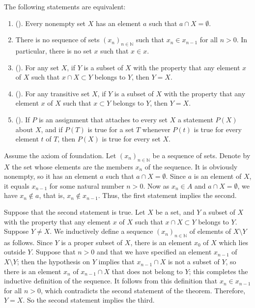 \documentclass{article}
\begin{document}
\begin{theorem}
  \label{thm:3e5kymup}
  The following statements are equivalent:
  \begin{enumerate}
  \item ().  Every nonempty set \(X\)
    has an element \(a\) such that \(a \cap X = \emptyset\).
  \item There is no sequence of sets \((x_n)_{n \in \mathbb{N}}\) such
    that \(x_n \in x_{n - 1}\) for all \(n > 0\).  In particular,
    there is no set \(x\) such that \(x \in x\).
  \item (). For any set
    \(X\), if \(Y\) is a subset of \(X\) with the property that any
    element \(x\) of \(X\) such that \(x \cap X \subset Y\) belongs to
    \(Y\), then \(Y = X\).
  \item (). For any
    transitive set \(X\), if \(Y\) is a subset of \(X\) with the
    property that any element \(x\) of \(X\) such that \(x \subset Y\)
    belongs to \(Y\), then \(Y = X\).
  \item \label{item:d0wtwe3c} (). If \(P\) is an assignment that attaches to
    every set \(X\) a statement \(P(X)\) about \(X\), and if \(P(T)\)
    is true for a set \(T\) whenever \(P(t)\) is true for every
    element \(t\) of \(T\), then \(P(X)\) is true for every set \(X\).
  \end{enumerate}
\end{theorem}

Assume the axiom of foundation.  Let \((x_n)_{n \in \mathbb{N}}\) be a
sequence of sets.  Denote by \(X\) the set whose elements are the
members \(x_n\) of the sequence.  It is obviously nonempty, so it has
an element \(a\) such that \(a \cap X = \emptyset\).  Since \(a\) is
an element of \(X\), it equals \(x_{n - 1}\) for some natural number
\(n > 0\).  Now as \(x_n \in A\) and \(a \cap X = \emptyset\), we have
\(x_n \notin a\), that is, \(x_n \notin x_{n - 1}\).  Thus, the first
statement implies the second.

Suppose that the second statement is true.  Let \(X\) be a set, and
\(Y\) a subset of \(X\) with the property that any element \(x\) of
\(X\) such that \(x \cap X \subset Y\) belongs to \(Y\).  Suppose
\(Y \neq X\).  We inductively define a sequence
\((x_n)_{n \in \mathbb{N}}\) of elements of \(X \setminus Y\) as
follows.  Since \(Y\) is a proper subset of \(X\), there is an element
\(x_0\) of \(X\) which lies outside \(Y\).  Suppose that \(n > 0\) and
that we have specified an element \(x_{n - 1}\) of \(X \setminus Y\);
then the hypothesis on \(Y\) implies that \(x_{n - 1} \cap X\) is not
a subset of \(Y\), so there is an element \(x_n\) of
\(x_{n - 1} \cap X\) that does not belong to \(Y\); this completes the
inductive definition of the sequence.  It follows from this definition
that \(x_n \in x_{n - 1}\) for all \(n > 0\), which contradicts the
second statement of the theorem.  Therefore, \(Y = X\).  So the second
statement implies the third.
\end{document}

